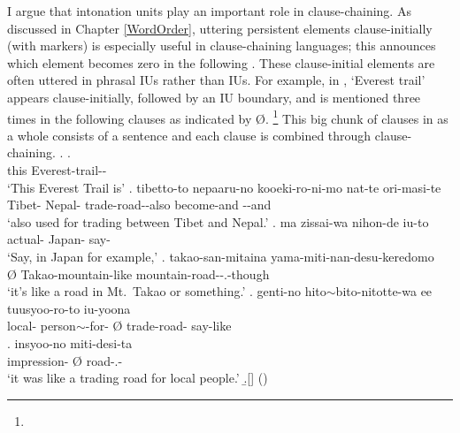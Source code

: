 I argue that intonation units play an important role in clause-chaining.
As discussed in Chapter \ref{WordOrder},
uttering persistent elements clause-initially (with  markers) is especially useful in clause-chaining languages;
this announces which element becomes zero in the following .
These clause-initial elements are often uttered in phrasal IUs rather than  IUs.
For example, in \Next,
 `Everest trail' appears clause-initially,
followed by an IU boundary,
and is mentioned three times in the following clauses as indicated by {\O}.%
 \footnote{
 }
This big chunk of clauses in \Next as a whole consists of a sentence and
each clause is combined through clause-chaining.
%
\ex.
\ag.   {\tp{\dvline}} \\
	this Everest-trail-- {} \\
	`{This Everest Trail} is'
\bg. tibetto-to nepaaru-no \tp{\dvline} kooeki-ro-ni-mo nat-te ori-masi-te\tp{\dvline} \\
	Tibet- Nepal- {} trade-road--also become-and --and \\
	`also used for trading  between Tibet and Nepal.'
\cg. ma zissai-wa nihon-de iu-to \tp{\dvline} \\
	 actual- Japan- say- {} \\
	`Say, in Japan for example,'
\dg. \EM{\O} takao-san-mitaina \tp{\dvline} yama-miti-nan-desu-keredomo \tp{\dvline} \\
	{\O} Takao-mountain-like {} mountain-road--.-though {} \\
	`it's like a road in Mt.\ Takao or something.'
\eg. genti-no hito$\sim$bito-nitotte-wa \tp{\dvline} ee \tp{\dvline} \EM{\O} tuusyoo-ro-to \tp{\dvline} iu-yoona \\
	local- person$\sim$-for- {}  {} {\O} trade-road- {} say-like \\
\bg. insyoo-no \EM{\O} miti-desi-ta \tp{\dvline} \\
	 impression- {\O} road-.- {} \\
 `{it} was like a trading road for local people.'
 \b.[] \hfill{()}

